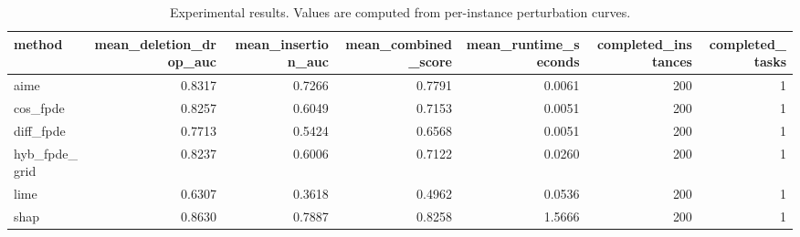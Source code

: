 \begin{table}[t]
\caption{Experimental results. Values are computed from per-instance perturbation curves.}
\label{tab:main_results_computed}
\centering
\begin{tabular}{lrrrrrr}
\toprule
method & mean\_deletion\_drop\_auc & mean\_insertion\_auc & mean\_combined\_score & mean\_runtime\_seconds & completed\_instances & completed\_tasks \\
\midrule
aime & 0.8317 & 0.7266 & 0.7791 & 0.0061 & 200 & 1 \\
cos\_fpde & 0.8257 & 0.6049 & 0.7153 & 0.0051 & 200 & 1 \\
diff\_fpde & 0.7713 & 0.5424 & 0.6568 & 0.0051 & 200 & 1 \\
hyb\_fpde\_grid & 0.8237 & 0.6006 & 0.7122 & 0.0260 & 200 & 1 \\
lime & 0.6307 & 0.3618 & 0.4962 & 0.0536 & 200 & 1 \\
shap & 0.8630 & 0.7887 & 0.8258 & 1.5666 & 200 & 1 \\
\bottomrule
\end{tabular}

\end{table}
